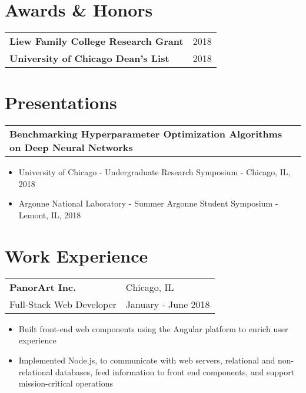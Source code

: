 \documentclass[letterpaper, 12pt]{article}
\begin{document}
\section{Awards \& Honors}
\vspace{10pt}
{
  \begin{tabular}{@{} L{12cm} @{} R{4.51cm} @{}}
    \textbf{Liew Family College Research Grant} & 2018 \\
    \textbf{University of Chicago Dean's List} & 2018 \\
  \end{tabular}
}

\section{Presentations}
\vspace{10pt}
{
  \begin{tabular}{@{} L{12cm} @{} R{4.51cm} @{}}
    \textbf{Benchmarking Hyperparameter Optimization Algorithms on Deep Neural Networks} & \\
  \end{tabular}
}
\vspace{-10pt}
\begin{itemize}
  \item University of Chicago - Undergraduate Research Symposium - Chicago, IL, 2018
  \item Argonne National Laboratory - Summer Argonne Student Symposium - Lemont, IL, 2018
\end{itemize}


\section{Work Experience}
\vspace{10pt}
{
  \begin{tabular}{@{} L{12cm} @{} R{4.51cm} @{}}
    \textbf{PanorArt Inc.} & Chicago, IL \\
    Full-Stack Web Developer & January - June 2018 \\
  \end{tabular}
}
\vspace{-10pt}
\begin{itemize}
  \item Built front-end web components using the Angular platform to enrich user experience
  \item Implemented Node.js, to communicate with web servers, relational and non-relational databases, feed information to front end components, and support mission-critical operations
\end{itemize}
\end{document}
